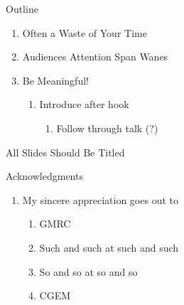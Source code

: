 \documentclass[aspectratio=169]{beamer}
\begin{document}
  \titleframe

  \begin{frame}{Outline}
    \begin{enumerate}
      \item Often a Waste of Your Time
      \item Audiences Attention Span Wanes
      \item Be Meaningful! \\[1mm]
      \begin{enumerate}
        \item Introduce after hook \\[2mm]
        \begin{enumerate}
          \item Follow through talk (?)
        \end{enumerate}
      \end{enumerate}
    \end{enumerate}
  \end{frame}
 
  \begin{frame}{All Slides Should Be Titled}
  \end{frame}
  
  \begin{frame}{Acknowledgments}
    \begin{enumerate}
      \item My sincere appreciation goes out to
      \begin{enumerate}
        \item GMRC
        \item Such and such at such and such
        \item So and so at so and so
        \item CGEM 
      \end{enumerate}
    \end{enumerate}
  \end{frame}

  \questionslide
 
  \begin{frame}
    \printbibliography
  \end{frame}
\end{document}
